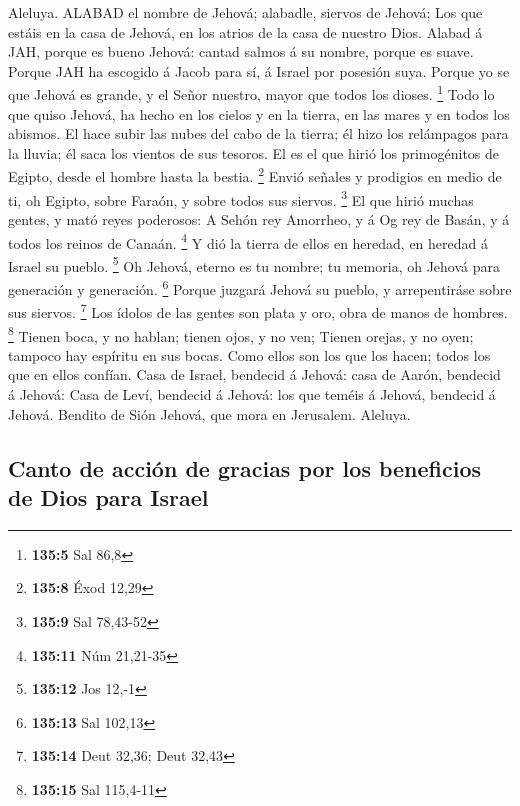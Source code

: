  Aleluya. ALABAD el nombre de Jehová; alabadle, siervos de
Jehová;  Los que estáis en la casa de Jehová, en los atrios
de la casa de nuestro Dios.  Alabad á JAH, porque es bueno
Jehová: cantad salmos á su nombre, porque es suave.  Porque
JAH ha escogido á Jacob para sí, á Israel por posesión suya.
 Porque yo se que Jehová es grande, y el Señor nuestro,
mayor que todos los dioses. \footnote{\textbf{135:5} Sal 86,8}
 Todo lo que quiso Jehová, ha hecho en los cielos y en la
tierra, en las mares y en todos los abismos.  El hace subir
las nubes del cabo de la tierra; él hizo los relámpagos para la lluvia;
él saca los vientos de sus tesoros.  El es el que hirió los
primogénitos de Egipto, desde el hombre hasta la bestia. \footnote{\textbf{135:8}
  Éxod 12,29}  Envió señales y prodigios en medio de ti, oh
Egipto, sobre Faraón, y sobre todos sus siervos. \footnote{\textbf{135:9}
  Sal 78,43-52}  El que hirió muchas gentes, y mató reyes
poderosos:  A Sehón rey Amorrheo, y á Og rey de Basán, y á
todos los reinos de Canaán. \footnote{\textbf{135:11} Núm 21,21-35}
 Y dió la tierra de ellos en heredad, en heredad á Israel
su pueblo. \footnote{\textbf{135:12} Jos 12,-1}  Oh Jehová,
eterno es tu nombre; tu memoria, oh Jehová para generación y generación.
\footnote{\textbf{135:13} Sal 102,13}  Porque juzgará
Jehová su pueblo, y arrepentiráse sobre sus siervos. \footnote{\textbf{135:14}
  Deut 32,36; Deut 32,43}  Los ídolos de las gentes son
plata y oro, obra de manos de hombres. \footnote{\textbf{135:15} Sal
  115,4-11}  Tienen boca, y no hablan; tienen ojos, y no
ven;  Tienen orejas, y no oyen; tampoco hay espíritu en sus
bocas.  Como ellos son los que los hacen; todos los que en
ellos confían.  Casa de Israel, bendecid á Jehová: casa de
Aarón, bendecid á Jehová:  Casa de Leví, bendecid á Jehová:
los que teméis á Jehová, bendecid á Jehová.  Bendito de
Sión Jehová, que mora en Jerusalem. Aleluya.

\hypertarget{canto-de-acciuxf3n-de-gracias-por-los-beneficios-de-dios-para-israel}{%
\subsection{Canto de acción de gracias por los beneficios de Dios para
Israel}\label{canto-de-acciuxf3n-de-gracias-por-los-beneficios-de-dios-para-israel}}

